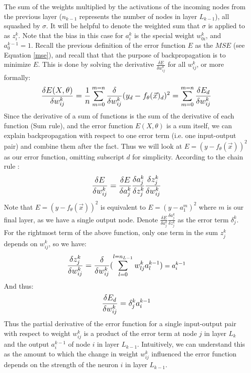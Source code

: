 \documentclass[12pt]{article}
\begin{document}
The sum of the weights multiplied by the activations of the incoming nodes from the previous layer ($n_{k-1}$ represents the number of nodes in layer $L_{k-1}$), all squashed by $\sigma$. It will be helpful to denote the weighted sum that $\sigma$ is applied to as $z^k_i$. Note that the bias in this case for $a_i^k$ is the special weight $w^k_{0i}$, and $a^{k-1}_0 = 1$. Recall the previous definition of the error function $E$ as the $MSE$ (see Equation \ref{mse}), and recall that that the purpose of backpropagation is to minimize $E$. This is done by solving the derivative $\frac{\delta E}{\delta w^k_{ij}}$ for all $w^k_{ij}$, or more formally:
\begin{equation}\label{Eq1}
    \mathlarger{
    \frac{\delta E(X,\theta)}{\delta w^k_{ij}} = \frac{1}{n} \sum\limits_{m=0}^{m=n}\frac{\delta}{\delta w^k_{ij}}(y_d - f_{\theta}(\vec{x})_d)^2 = \sum\limits_{m=0}^{m=n}\frac{\delta E_d}{\delta w^k_{ij}}}
\end{equation}
Since the derivative of a sum of functions is the sum of the derivative of each function (Sum rule), and the error function $E(X,\theta)$ is a sum itself, we can explain backpropagation with respect to one error term (i.e. one input-output pair) and combine them after the fact.
Thus we will look at $E = (y - f_{\theta}(\vec{x}))^2$ as our error function, omitting subscript $d$ for simplicity. According to the chain rule :
\begin{equation}
    \mathlarger{
    \frac{\delta E}{\delta w^k_{ij}} = \frac{\delta E}{\delta a^k_j}\frac{\delta  a^k_j}{\delta z^k_j}\frac{\delta  z^k_j}{\delta w^k_{ij}}}
\end{equation}
Note that $E = (y - f_{\theta}(\vec{x}))^2$ is equivalent to $E = (y -  a^m_1)^2$ where $m$ is our final layer, as we have a single output node. Denote $ \frac{\delta E}{\delta a^k_j}\frac{\delta  a^k_j}{\delta z^k_j}$ as the error term $\delta^k_j$. For the rightmost term of the above function, only one term in the sum $z^k_j$ depends on $w^k_{ij}$, so we have:
\begin{equation}
    \mathlarger{\frac{\delta  z^k_j}{\delta w^k_{ij}} = \frac{\delta}{\delta w^k_{ij}}(\sum\limits_{l=0}^{l=n_{L-1}}w_{lj}^ka^{k-1}_l)} = a^{k-1}_i
\end{equation}
And thus:
\begin{equation}\label{Eq2}
    \mathlarger{
    \frac{\delta E_d}{\delta w^k_{ij}} =  \delta^k_ja^{k-1}_i}
\end{equation}
Thus the partial derivative of the error function for a single input-output pair with respect to weight $w^k_{ij}$ is a product of the error term at node $j$ in layer $L_k$ and the output $a^{k-1}_i$ of node $i$ in layer $L_{k-1}$. Intuitively, we can understand this as the amount to which the change in weight $w^k_{ij}$ influenced the error function depends on the strength of the neuron $i$ in layer $L_{k-1}$.
\end{document}
